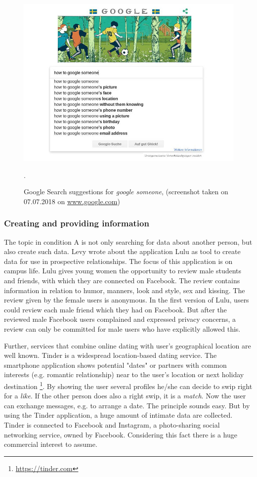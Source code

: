 \begin{figure}[htb]
  \centering
  \includegraphics[width=\linewidth]{img/how_to_google_someone.jpeg}
  \caption{Google Search suggestions for \textit{google someone}, (screenshot taken on 07.07.2018 on \url{www.google.com})}.
  \label{fig:how_to_google_someone}
\end{figure}

\subsubsection{Creating and providing information}
The topic in condition A is not only searching for data about another person, but also create such data. Levy \cite{levy2014intimate} wrote about the application Lulu as tool to create data for use in prospective relationships. The focus of this application is on campus life. Lulu gives young women the opportunity to review male students and friends, with which they are connected on Facebook. The review contains information in relation to humor, manners, look and style, sex and kissing. The review given by the female users is anonymous. In the first version of Lulu, users could review each male friend which they had on Facebook. But after the reviewed male Facebook users complained and expressed privacy concerns, a review can only be committed for male users who have explicitly allowed this.

Further, services that combine online dating with user's geographical location are well known. Tinder is a widespread location-based dating service. The smartphone application shows potential "dates" or partners with common interests (e.g. romantic relationship) near to the user's location or next holiday destination \footnote{\url{https://tinder.com}}. By showing the user several profiles he/she can decide to swip right for a \textit{like}. If the other person does also a right swip, it is a \textit{match}. Now the user can exchange messages, e.g. to arrange a date. The principle sounds easy. But by using the Tinder application, a huge amount of intimate data are collected. 
Tinder is connected to Facebook and Instagram, a photo-sharing social networking service, owned by Facebook. Considering this fact there is a huge commercial interest to assume.

